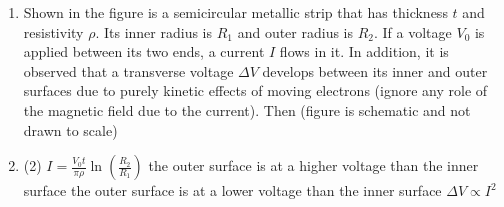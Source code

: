 
\begin{enumerate}
    \item Shown in the figure is a semicircular metallic strip that has thickness $t$ and resistivity $\rho$. Its inner radius is $R_1$ and outer radius is $R_2$. If a voltage $V_0$ is applied between its two ends, a current $I$ flows in it. In addition, it is observed that a transverse voltage $\Delta V$ develops between its inner and outer surfaces due to purely kinetic effects of moving electrons (ignore any role of the magnetic field due to the current). Then (figure is schematic and not drawn to scale)
        \begin{center}
        \end{center}
    \item 
        \begin{tasks}(2)
            \task $I = \frac{V_0 t}{\pi \rho} \ln\left(\frac{R_2}{R_1}\right)$
            \task the outer surface is at a higher voltage than the inner surface
            \task the outer surface is at a lower voltage than the inner surface
            \task $\Delta V \propto I^2$
        \end{tasks}
\end{enumerate}
